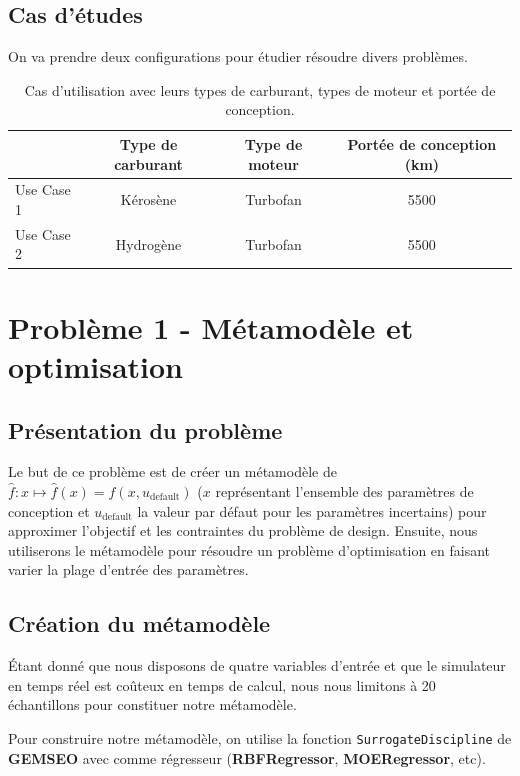 \documentclass[a4paper, 11pt]{article}
\begin{document}
\subsection{Cas d'études}
On va prendre deux configurations pour étudier résoudre divers problèmes.

\begin{table}[H]
\centering
\begin{tabular}{l c c c}
\toprule
\textbf{} & \textbf{Type de carburant} & \textbf{Type de moteur} & \textbf{Portée de conception (km)} \\
\midrule
Use Case 1 & Kérosène & Turbofan & 5500 \\
Use Case 2 & Hydrogène & Turbofan & 5500 \\
\bottomrule
\end{tabular}
\caption{Cas d'utilisation avec leurs types de carburant, types de moteur et portée de conception.}
\end{table}


\section{Problème 1 - Métamodèle et optimisation}

\subsection{Présentation du problème}
Le but de ce problème est de créer un métamodèle de $\hat{f}:x\mapsto \hat{f}(x)=f(x,u_{\text{default}})$ ($x$ représentant l'ensemble des paramètres de conception et $u_{\text{default}}$ la valeur par défaut pour les paramètres incertains) pour approximer l'objectif et les contraintes du problème de design. Ensuite, nous utiliserons le métamodèle pour résoudre un problème d'optimisation en faisant varier la plage d'entrée des paramètres.

\subsection{Création du métamodèle}
Étant donné que nous disposons de quatre variables d’entrée et que le simulateur en temps réel est coûteux en temps de calcul, nous nous limitons à 20 échantillons pour constituer notre métamodèle. \newline

Pour construire notre métamodèle, on utilise la fonction \texttt{SurrogateDiscipline} de \textbf{GEMSEO} avec comme régresseur (\textbf{RBFRegressor}, \textbf{MOERegressor}, etc). \newline
\end{document}
